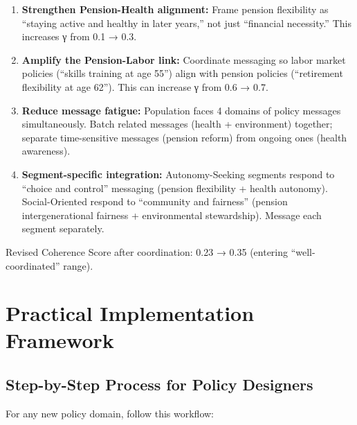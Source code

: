 \begin{enumerate}
\item \textbf{Strengthen Pension-Health alignment:} Frame pension flexibility as ``staying active and healthy in later years,'' not just ``financial necessity.'' This increases γ from 0.1 → 0.3.

\item \textbf{Amplify the Pension-Labor link:} Coordinate messaging so labor market policies (``skills training at age 55'') align with pension policies (``retirement flexibility at age 62''). This can increase γ from 0.6 → 0.7.

\item \textbf{Reduce message fatigue:} Population faces 4 domains of policy messages simultaneously. Batch related messages (health + environment) together; separate time-sensitive messages (pension reform) from ongoing ones (health awareness).

\item \textbf{Segment-specific integration:} Autonomy-Seeking segments respond to ``choice and control'' messaging (pension flexibility + health autonomy). Social-Oriented respond to ``community and fairness'' (pension intergenerational fairness + environmental stewardship). Message each segment separately.
\end{enumerate}

Revised Coherence Score after coordination: 0.23 → 0.35 (entering ``well-coordinated'' range).


\section{Practical Implementation Framework}
\label{sec:implementation}

\subsection{Step-by-Step Process for Policy Designers}

For any new policy domain, follow this workflow:

